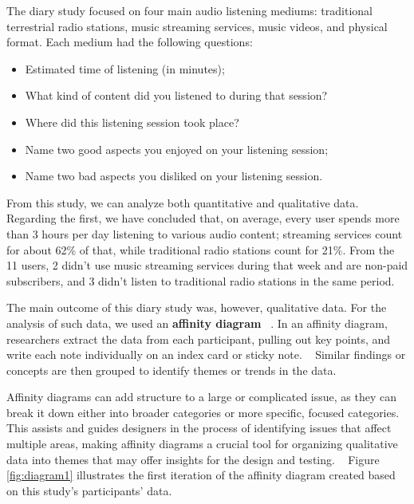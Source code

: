 The diary study focused on four main audio listening mediums: traditional terrestrial radio stations, music streaming services, music videos, and physical format. Each medium had the following questions:

\begin{itemize}
  \item Estimated time of listening (in minutes);
  \item What kind of content did you listened to during that session?
  \item Where did this listening session took place?
  \item Name two good aspects you enjoyed on your listening session;
  \item Name two bad aspects you disliked on your listening session.
\end{itemize}

From this study, we can analyze both quantitative and qualitative data. Regarding the first, we have concluded that, on average, every user spends more than 3 hours per day listening to various audio content; streaming services count for about 62\% of that, while traditional radio stations count for 21\%. From the 11 users, 2 didn't use music streaming services during that week and are non-paid subscribers, and 3 didn't listen to traditional radio stations in the same period. 

The main outcome of this diary study was, however, qualitative data. For the analysis of such data, we used an \textbf{affinity diagram} ~\cite{Wilson2012}. In an affinity diagram, researchers extract the data from each participant, pulling out key points, and write each note individually on an index card or sticky note. ~\cite{Courage2005} Similar findings or concepts are then grouped to identify themes or trends in the data. 

Affinity diagrams can add structure to a large or complicated issue, as they can break it down either into broader categories or more specific, focused categories. This assists and guides designers in the process of identifying issues that affect multiple areas, making affinity diagrams a crucial tool for organizing qualitative data into themes that may offer insights for the design and testing. ~\cite{Holtzblatt1988} Figure \ref{fig:diagram1} illustrates the first iteration of the affinity diagram created based on this study's participants' data.

